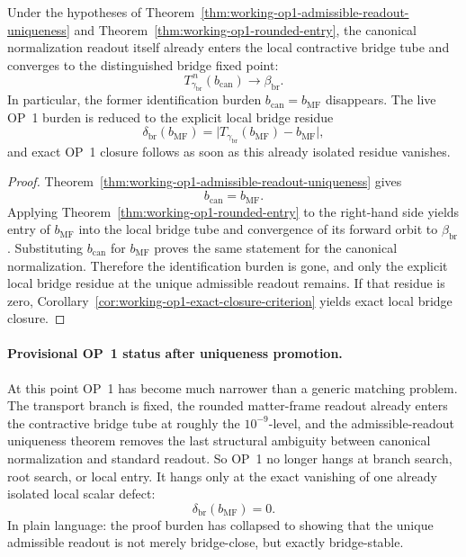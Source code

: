 \begin{corollary}
\label{cor:working-op1-structural-promotion}
Under the hypotheses of Theorem~\ref{thm:working-op1-admissible-readout-uniqueness} and Theorem~\ref{thm:working-op1-rounded-entry}, the canonical normalization readout itself already enters the local contractive bridge tube and converges to the distinguished bridge fixed point:
\[
  T_{\gamma_{\mathrm{br}}}^{\,n}(b_{\mathrm{can}})\longrightarrow \beta_{\mathrm{br}}.
\]
In particular, the former identification burden \(b_{\mathrm{can}}=b_{\mathrm{MF}}\) disappears. The live OP~1 burden is reduced to the explicit local bridge residue
\[
  \delta_{\mathrm{br}}(b_{\mathrm{MF}})=\bigl|T_{\gamma_{\mathrm{br}}}(b_{\mathrm{MF}})-b_{\mathrm{MF}}\bigr|,
\]
and exact OP~1 closure follows as soon as this already isolated residue vanishes.
\end{corollary}

\begin{proof}
Theorem~\ref{thm:working-op1-admissible-readout-uniqueness} gives
\[
  b_{\mathrm{can}}=b_{\mathrm{MF}}.
\]
Applying Theorem~\ref{thm:working-op1-rounded-entry} to the right-hand side yields entry of \(b_{\mathrm{MF}}\) into the local bridge tube and convergence of its forward orbit to \(\beta_{\mathrm{br}}\). Substituting \(b_{\mathrm{can}}\) for \(b_{\mathrm{MF}}\) proves the same statement for the canonical normalization. Therefore the identification burden is gone, and only the explicit local bridge residue at the unique admissible readout remains. If that residue is zero, Corollary~\ref{cor:working-op1-exact-closure-criterion} yields exact local bridge closure.
\end{proof}

\paragraph{Provisional OP~1 status after uniqueness promotion.}
At this point OP~1 has become much narrower than a generic matching problem. The transport branch is fixed, the rounded matter-frame readout already enters the contractive bridge tube at roughly the \(10^{-9}\)-level, and the admissible-readout uniqueness theorem removes the last structural ambiguity between canonical normalization and standard readout. So OP~1 no longer hangs at branch search, root search, or local entry. It hangs only at the exact vanishing of one already isolated local scalar defect:
\[
  \delta_{\mathrm{br}}(b_{\mathrm{MF}})=0.
\]
In plain language: the proof burden has collapsed to showing that the unique admissible readout is not merely bridge-close, but exactly bridge-stable.

\clearpage

